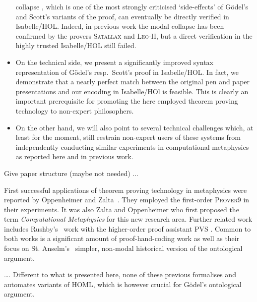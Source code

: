 \documentclass{article}
\begin{document}
\begin{itemize}
  collapse \cite{Sobel}, which is one of the most strongly criticised
  `side-effects' of G\"odel's and Scott's variants of the proof, can
  eventually be directly verified in Isabelle/HOL. Indeed, in previous work
  the modal collapse has been confirmed by the provers
  \textsc{Satallax} \cite{Satallax} and \textsc{Leo-II}, but a
  direct verification in the highly trusted Isabelle/HOL still failed.
\item On the technical side, we present a significantly improved
  syntax representation of G\"odel's resp.~Scott's proof in
  Isabelle/HOL. In fact, we demonstrate that a nearly perfect match
  between the original pen and paper presentations and our encoding in
  Isabelle/HOl is feasible. This is clearly an important prerequisite
  for promoting the here employed theorem proving technology to
  non-expert philosophers.
\item On the other hand, we will
  also point to several technical challenges which, at least for the
  moment, still restrain non-expert users of these systems from
  independently conducting similar experiments in computational
  metaphysics as reported here and in previous work. 
\end{itemize}


Give paper structure (maybe not needed) ...


First successful applications of theorem proving technology in
metaphysics were reported by Oppenheimer and
Zalta~. They employed the first-order
\textsc{Prover9} \cite{Prover9} in their experiments. It was also
Zalta and Oppenheimer who first proposed the term
\textit{Computational Metaphysics} for this new research area. Further
related work includes Rushby's~ work with the
higher-order proof assistant \textsc{PVS} \cite{PVS}. Common to both
works is a significant amount of proof-hand-coding work as well as their
focus on St. Anselm's~ simpler, non-modal historical
version of the ontological argument.

\ldots. Different to what is presented here, none of these previous
formalises and automates variants of HOML, which is however crucial
for G\"{o}del's ontological argument.
\end{document}
